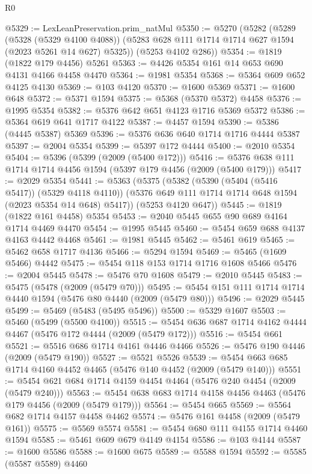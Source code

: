 \begin{lexlean}{R0}
\begin{coremodule}
@5329 := LexLeanPreservation.prim_natMul
@5350 := @5270
    (@5282
      (@5289
        (@5328 (@5329 @4100 @4088))
        (@5283 @628 @111 @1714 @1714 @627 @1594 (@2023 @5261 @14 @627) @5325))
      (@5253 @4102 @286))
@5354 := @1819 (@1822 @179 @4456) @5261
@5363 := @4426 @5354 @161 @14 @653 @690 @4131 @4166 @4458 @4470
@5364 := @1981 @5354
@5368 := @5364 @609 @652 @4125 @4130
@5369 := @103 @4120
@5370 := @1600 @5369
@5371 := @1600 @648
@5372 := @5371 @1594
@5375 := @5368 (@5370 @5372) @4458
@5376 := @1995 @5354
@5382 := @5376 @642 @651 @4123 @1716 @5369 @5372
@5386 := @5364 @619 @641 @1717 @4122
@5387 := @4457 @1594
@5390 := @5386 (@4445 @5387) @5369
@5396 := @5376 @636 @640 @1714 @1716 @4444 @5387
@5397 := @2004 @5354
@5399 := @5397 @172 @4444
@5400 := @2010 @5354
@5404 := @5396 (@5399 (@2009 (@5400 @172)))
@5416 := @5376 @638 @111 @1714 @1714 @4456 @1594 (@5397 @179 @4456 (@2009 (@5400 @179)))
@5417 := @2029 @5354
@5441 := @5363
    (@5375
      (@5382
        (@5390 (@5404 (@5416 @5417)) (@5329 @4118 @4110))
        (@5376 @649 @111 @1714 @1714 @648 @1594 (@2023 @5354 @14 @648) @5417))
      (@5253 @4120 @647))
@5445 := @1819 (@1822 @161 @4458) @5354
@5453 := @2040 @5445 @655 @90 @689 @4164 @1714 @4469 @4470
@5454 := @1995 @5445
@5460 := @5454 @659 @688 @4137 @4163 @4442 @4468
@5461 := @1981 @5445
@5462 := @5461 @619
@5465 := @5462 @658 @1717 @4136
@5466 := @5294 @1594
@5469 := @5465 (@1609 @5466) @4442
@5475 := @5454 @118 @153 @1714 @1716 @1608 @5466
@5476 := @2004 @5445
@5478 := @5476 @70 @1608
@5479 := @2010 @5445
@5483 := @5475 (@5478 (@2009 (@5479 @70)))
@5495 := @5454 @151 @111 @1714 @1714 @4440 @1594 (@5476 @80 @4440 (@2009 (@5479 @80)))
@5496 := @2029 @5445
@5499 := @5469 (@5483 (@5495 @5496))
@5500 := @5329 @1607
@5503 := @5460 (@5499 (@5500 @4100))
@5515 := @5454 @636 @687 @1714 @4162 @4444 @4467 (@5476 @172 @4444 (@2009 (@5479 @172)))
@5516 := @5454 @661
@5521 := @5516 @686 @1714 @4161 @4446 @4466
@5526 := @5476 @190 @4446 (@2009 (@5479 @190))
@5527 := @5521 @5526
@5539 := @5454 @663 @685 @1714 @4160 @4452 @4465 (@5476 @140 @4452 (@2009 (@5479 @140)))
@5551 := @5454 @621 @684 @1714 @4159 @4454 @4464 (@5476 @240 @4454 (@2009 (@5479 @240)))
@5563 := @5454 @638 @683 @1714 @4158 @4456 @4463 (@5476 @179 @4456 (@2009 (@5479 @179)))
@5564 := @5454 @665
@5569 := @5564 @682 @1714 @4157 @4458 @4462
@5574 := @5476 @161 @4458 (@2009 (@5479 @161))
@5575 := @5569 @5574
@5581 := @5454 @680 @111 @4155 @1714 @4460 @1594
@5585 := @5461 @609 @679 @4149 @4154
@5586 := @103 @4144
@5587 := @1600 @5586
@5588 := @1600 @675
@5589 := @5588 @1594
@5592 := @5585 (@5587 @5589) @4460

\end{coremodule}
\end{lexlean}
